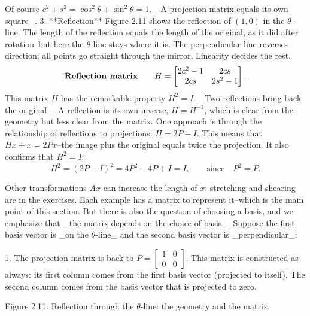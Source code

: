 Of course \(c^{2}+s^{2}=\cos^{2}\theta+\sin^{2}\theta=1\). _A projection matrix equals its own square_.
3. **Reflection** Figure 2.11 shows the reflection of \((1,0)\) in the \(\theta\)-line. The length of the reflection equals the length of the original, as it did after rotation--but here the \(\theta\)-line stays where it is. The perpendicular line reverses direction; all points go straight through the mirror, Linearity decides the rest. \[\mbox{\bf Reflection matrix}\qquad H=\begin{bmatrix}2c^{2}-1&2cs\\ 2cs&2s^{2}-1\end{bmatrix}.\] This matrix \(H\) has the remarkable property \(H^{2}=I\). _Two reflections bring back the original_. A reflection is its own inverse, \(H=H^{-1}\), which is clear from the geometry but less clear from the matrix. One approach is through the relationship of reflections to projections: \(H=2P-I\). This means that \(Hx+x=2Px\)--the image plus the original equals twice the projection. It also confirms that \(H^{2}=I\): \[H^{2}=(2P-I)^{2}=4P^{2}-4P+I=I,\qquad\mbox{since}\quad P^{2}=P.\]

Other transformations \(Ax\) can increase the length of \(x\); stretching and shearing are in the exercises. Each example has a matrix to represent it--which is the main point of this section. But there is also the question of choosing a basis, and we emphasize that _the matrix depends on the choice of basis_. Suppose the first basis vector is _on the \(\theta\)-line_ and the second basis vector is _perpendicular_:

1. The projection matrix is back to \(P=\begin{bmatrix}1&0\\ 0&0\end{bmatrix}\). This matrix is constructed as always: its first column comes from the first basis vector (projected to itself). The second column comes from the basis vector that is projected to zero.

Figure 2.11: Reflection through the \(\theta\)-line: the geometry and the matrix.

 